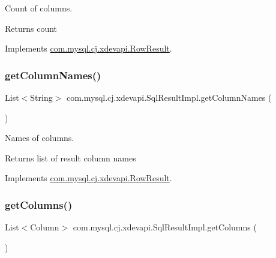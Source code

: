 Count of columns.

\begin{DoxyReturn}{Returns}
count 
\end{DoxyReturn}


Implements \mbox{\hyperlink{interfacecom_1_1mysql_1_1cj_1_1xdevapi_1_1_row_result_aaf66f729c7c99e7ceb90ea49c4631ef0}{com.\+mysql.\+cj.\+xdevapi.\+Row\+Result}}.

\mbox{\label{classcom_1_1mysql_1_1cj_1_1xdevapi_1_1_sql_result_impl_a9f539396fee9a85bbebbb39d803c9eea}} 
\subsubsection{\texorpdfstring{get\+Column\+Names()}{getColumnNames()}}
{\footnotesize\ttfamily List$<$String$>$ com.\+mysql.\+cj.\+xdevapi.\+Sql\+Result\+Impl.\+get\+Column\+Names (\begin{DoxyParamCaption}{ }\end{DoxyParamCaption})}

Names of columns.

\begin{DoxyReturn}{Returns}
list of result column names 
\end{DoxyReturn}


Implements \mbox{\hyperlink{interfacecom_1_1mysql_1_1cj_1_1xdevapi_1_1_row_result_acbc412c859e4618f3b924c602a82f541}{com.\+mysql.\+cj.\+xdevapi.\+Row\+Result}}.

\mbox{\label{classcom_1_1mysql_1_1cj_1_1xdevapi_1_1_sql_result_impl_a284f0953dcca6644eb9eff7749e32f9b}} 
\subsubsection{\texorpdfstring{get\+Columns()}{getColumns()}}
{\footnotesize\ttfamily List$<$Column$>$ com.\+mysql.\+cj.\+xdevapi.\+Sql\+Result\+Impl.\+get\+Columns (\begin{DoxyParamCaption}{ }\end{DoxyParamCaption})}

